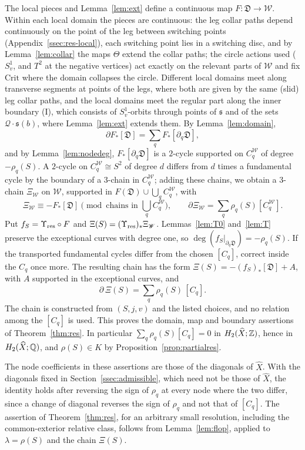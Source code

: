 The local pieces and Lemma~\ref{lem:ext} define a continuous map $F\colon\mathfrak D\to \mathscr W$. Within each local domain the pieces are
continuous: the leg collar paths depend continuously on the point of the leg between switching points
(Appendix~\ref{ssec:res-local}), each switching point lies in a switching disc, and by Lemma~\ref{lem:collar} the maps $\Theta$
extend the collar paths; the circle actions used ($S^1_v$, and $T^2$ at the negative vertices) act exactly on the relevant parts of
$\mathscr W$ and fix $\mathrm{Crit}$ where the domain collapses the circle. Different local domains meet along transverse segments at
points of the legs, where both are given by the same (slid) leg collar paths, and the local domains meet the regular part along
the inner boundary (I), which consists of $S^1_v$-orbits through points of $\mathfrak s$ and of the sets $\mathcal Q\cdot\mathfrak s(b)$,
where Lemma~\ref{lem:ext} extends them. By Lemma~\ref{lem:domain},
\[
\partial F_*[\mathfrak D]=\sum_qF_*[\partial_q\mathfrak D],
\]
and by Lemma~\ref{lem:nodedeg}, $F_*[\partial_q\mathfrak D]$ is a $2$-cycle supported on $C^{\mathscr W}_q$ of degree $-\rho_q(S)$. A
$2$-cycle on $C^{\mathscr W}_q\cong S^2$ of degree $d$ differs from $d$ times a fundamental cycle by the boundary of a $3$-chain in $C^{\mathscr W}_q$;
adding these chains, we obtain a $3$-chain $\Xi_{\mathscr W}$ on $\mathscr W$, supported in $F(\mathfrak D)\cup\bigcup_qC^{\mathscr W}_q$, with
\[
\Xi_{\mathscr W}\equiv-F_*[\mathfrak D]\pmod{\text{chains in }\textstyle\bigcup_qC^{\mathscr W}_q},\qquad\partial\Xi_{\mathscr W}=\sum_q\rho_q(S)[C^{\mathscr W}_q].
\]
Put $f_S=\Upsilon_{\rm res}\circ F$ and $\Xi(S)=(\Upsilon_{\rm res})_*\Xi_{\mathscr W}$.
Lemmas~\ref{lem:T0} and~\ref{lem:T} preserve the exceptional curves with degree one, so
$\deg(f_S|_{\partial_q\mathfrak D})=-\rho_q(S)$. If the transported fundamental cycles differ from the chosen $[C_q]$,
correct inside the $C_q$ once more. The resulting chain has the form
$\Xi(S)=-(f_S)_*[\mathfrak D]+A$, with $A$ supported in the exceptional curves, and
\[
\partial\,\Xi(S)=\sum_q\rho_q(S)\,[C_q].
\]
The chain is constructed from $(S,j,v)$ and the listed choices, and no relation among the $[C_q]$ is used. This proves the domain, map and boundary assertions of Theorem~\ref{thm:res}. In particular $\sum_q\rho_q(S)[C_q]=0$ in $H_2(\widehat X;\mathbb Z)$, hence in
$H_2(\widehat X;\mathbb Q)$, and $\rho(S)\in K$ by Proposition~\ref{prop:partialres}.

The node coefficients in these assertions are those of the diagonals of $\widehat X$. With the diagonals fixed in
Section~\ref{ssec:admissible}, which need not be those of $\widehat X$, the identity holds after reversing the sign of $\rho_q$
at every node where the two differ, since a change of diagonal reverses the sign of $\rho_q$ and not that of $[C_q]$. The
assertion of Theorem~\ref{thm:res}, for an arbitrary small
resolution, including the common-exterior relative class, follows from Lemma~\ref{lem:flop}, applied to $\lambda=\rho(S)$ and the chain $\Xi(S)$.

